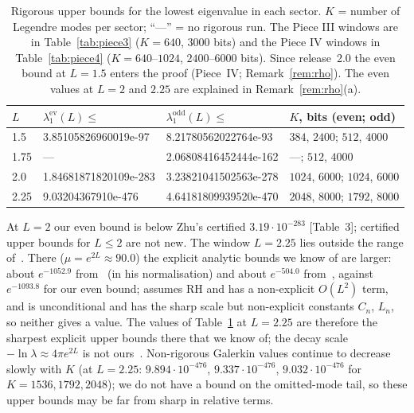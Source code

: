\documentclass[11pt]{amsart}
\newcommand{\ev}{\mathrm{ev}}
\newcommand{\od}{\mathrm{odd}}
\newcommand{\e}[1]{\cdot 10^{#1}}
\theoremstyle{definition}
\theoremstyle{remark}
\numberwithin{equation}{section}
\begin{document}
\begin{table}[ht]
\centering\footnotesize
\caption{Rigorous upper bounds for the lowest eigenvalue in each sector. $K$ = number of Legendre modes per sector; ``---'' = no rigorous run. The Piece III windows are in Table~\ref{tab:piece3} ($K=640$, $3000$ bits) and the Piece IV windows in Table~\ref{tab:piece4} ($K=640$--$1024$, $2400$--$6000$ bits). Since release~2.0 the even bound at $L=1.5$ enters the proof (Piece~IV; Remark~\ref{rem:rho}). The even values at $L=2$ and $2.25$ are explained in Remark~\ref{rem:rho}(a).}\label{tab:upper}
\begin{tabular}{llll}
\toprule
$L$ & $\lambda_1^\ev(L)\le$ & $\lambda_1^\od(L)\le$ & $K$, bits (even; odd)\\
\midrule
1.5 & 3.85105826960019e-97 & 8.21780562022764e-93 & $384$, $2400$; $512$, $4000$\\
1.75 & --- & 2.06808416452444e-162 & ---; $512$, $4000$\\
2.0 & 1.84681871820109e-283 & 3.23821041502563e-278 & $1024$, $6000$; $1024$, $6000$\\
2.25 & 9.03204367910e-476 & 4.64181809939520e-470 & $2048$, $8000$; $1792$, $8000$\\
\bottomrule
\end{tabular}
\end{table}

At $L=2$ our even bound is below Zhu's certified $3.19\e{-283}$ [Table~3]; certified upper bounds for $L\le2$ are not new. The window $L=2.25$ lies outside the range of~\cite{Zhu}. There ($\mu=e^{2L}\approx90.0$) the explicit analytic bounds we know of are larger: about $e^{-1052.9}$ from~\cite[Thm.~K(a)]{MoriV} (in his normalisation) and about $e^{-504.0}$ from~\cite[Thm.~2.1]{rh25}, against $e^{-1093.8}$ for our even bound; \cite[Thm.~1]{rh81} assumes RH and has a non-explicit $O(L^2)$ term, and \cite[Cor.~2]{rh83} is unconditional and has the sharp scale but non-explicit constants $C_n$, $L_n$, so neither gives a value. The values of Table~\ref{tab:upper} at $L=2.25$ are therefore the sharpest explicit upper bounds there that we know of; the decay scale $-\ln\lambda\approx4\pi e^{2L}$ is not ours~\cite{Connes26,MoriV,rh80,rh81}. Non-rigorous Galerkin values continue to decrease slowly with $K$ (at $L=2.25$: $9.894\e{-476}$, $9.337\e{-476}$, $9.032\e{-476}$ for $K=1536,1792,2048$); we do not have a bound on the omitted-mode tail, so these upper bounds may be far from sharp in relative terms.
\end{document}
